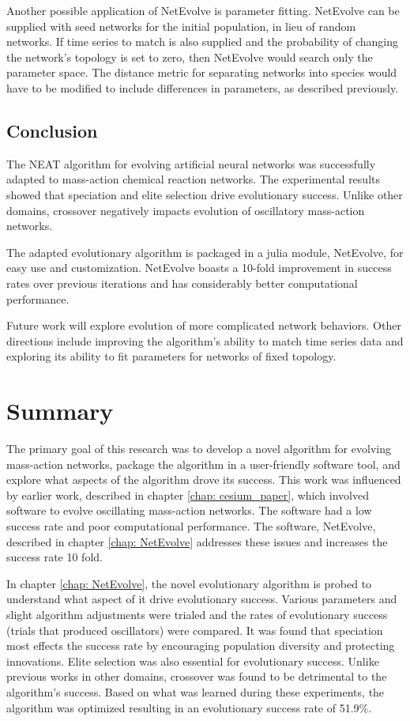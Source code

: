 \documentclass[12pt]{report}
\begin{document}
Another possible application of NetEvolve is parameter fitting. NetEvolve can be supplied with seed networks for the initial population, in lieu of random networks. If time series to match is also supplied and the probability of changing the network's topology is set to zero, then NetEvolve would search only the parameter space. The distance metric for separating networks into species would have to be modified to include differences in parameters, as described previously.

\section{Conclusion}
The NEAT algorithm for evolving artificial neural networks was successfully adapted to mass-action chemical reaction networks. The experimental results showed that speciation and elite selection drive evolutionary success. Unlike other domains, crossover negatively impacts evolution of oscillatory mass-action networks. 

The adapted evolutionary algorithm is packaged in a julia module, NetEvolve, for easy use and customization. NetEvolve boasts a 10-fold improvement in success rates over previous iterations and has considerably better computational performance.

Future work will explore evolution of more complicated network behaviors. Other directions include improving the algorithm's ability to match time series data and exploring its ability to fit parameters for networks of fixed topology.

\chapter{Summary}
The primary goal of this research was to develop a novel algorithm for evolving mass-action networks, package the algorithm in a user-friendly software tool, and explore what aspects of the algorithm drove its success. This work was influenced by earlier work, described in chapter \ref{chap: cesium_paper}, which involved software to evolve oscillating mass-action networks. The software had a low success rate and poor computational performance. The software, NetEvolve, described in chapter \ref{chap: NetEvolve} addresses these issues and increases the success rate 10 fold. 

In chapter \ref{chap: NetEvolve}, the novel evolutionary algorithm is probed to understand what aspect of it drive evolutionary success. Various parameters and slight algorithm adjustments were trialed and the rates of evolutionary success (trials that produced oscillators) were compared. It was found that speciation most effects the success rate by encouraging population diversity and protecting innovations. Elite selection was also essential for evolutionary success. Unlike previous works in other domains, crossover was found to be detrimental to the algorithm's success. Based on what was learned during these experiments, the algorithm was optimized resulting in an evolutionary success rate of 51.9\%.
\end{document}
